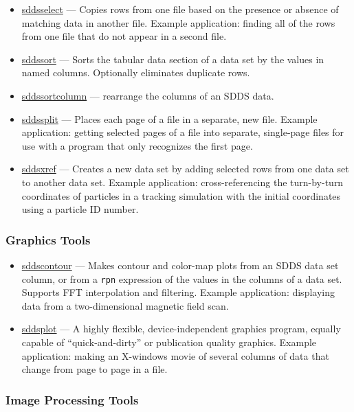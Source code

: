\documentclass[11pt]{article}
\newcommand{\progref}[1]{\hyperref{#1}{{\tt #1} (}{)}{#1}}
\begin{document}
\begin{itemize}
\item \progref{sddsselect} --- Copies rows from one file based on the
presence or absence of matching data in another file.  Example
application: finding all of the rows from one file that do not appear
in a second file.

\item \progref{sddssort} --- Sorts the tabular data section of a data set by the values in named columns.
Optionally eliminates duplicate rows.
\item \progref{sddssortcolumn} --- rearrange the columns of an SDDS data.
\item \progref{sddssplit} --- Places each page of a file in a separate, new file.  Example application: getting
selected pages of a file into separate, single-page files for use with a program that only recognizes the first
page.

\item \progref{sddsxref} --- Creates a new data set by adding selected
rows from one data set to another data set.  Example application:
cross-referencing the turn-by-turn coordinates of particles in a
tracking simulation with the initial coordinates using a particle ID
number.

\end{itemize}

\subsubsection{Graphics Tools}

\begin{itemize}

\item \progref{sddscontour} --- Makes contour and color-map plots from an SDDS data set column, or from a
\verb|rpn| expression of the values in the columns of a data set.  Supports FFT interpolation and filtering.
Example application: displaying data from a two-dimensional magnetic field scan.

\item \progref{sddsplot} --- A highly flexible, device-independent graphics program, equally capable of
``quick-and-dirty'' or publication quality graphics.  Example application: making an X-windows movie of several
columns of data that change from page to page in a file.

\end{itemize}

\subsubsection{Image Processing Tools}
\end{document}
